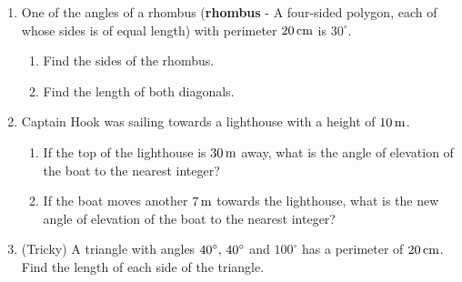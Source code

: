 \begin{enumerate}[noitemsep, label=\textbf{\arabic*}. ]
\label{m39414*uid113}\item One of the angles of a rhombus (\textbf{rhombus} - A four-sided polygon, each of whose sides is of equal length) with perimeter \begin{math}20\phantom{\rule{0.166667em}{0ex}}\mathrm{cm}\end{math} is \begin{math}{30}^{\circ }\end{math}.
\label{m39414*id92966}\begin{enumerate}[noitemsep, label=\textbf{\alph*}. ] 
            \label{m39414*uid114}\item Find the sides of the rhombus.
\label{m39414*uid115}\item Find the length of both diagonals.
\end{enumerate}
                \label{m39414*uid116}\item Captain Hook was sailing towards a lighthouse with a height of \begin{math}10\phantom{\rule{0.166667em}{0ex}}\mathrm{m}\end{math}.
\label{m39414*id93025}\begin{enumerate}[noitemsep, label=\textbf{\alph*}. ] 
            \label{m39414*uid117}\item If the top of the lighthouse is \begin{math}30\phantom{\rule{0.166667em}{0ex}}\mathrm{m}\end{math} away, what is the angle of elevation of the boat to the nearest integer?
\label{m39414*uid118}\item If the boat moves another \begin{math}7\phantom{\rule{0.166667em}{0ex}}\mathrm{m}\end{math} towards the lighthouse, what is the new angle of elevation of the boat to the nearest integer?
\end{enumerate}
                \label{m39414*uid119}\item (Tricky) A triangle with angles \begin{math}{40}^{\circ },\phantom{\rule{0.166667em}{0ex}}{40}^{\circ }\end{math} and \begin{math}{100}^{\circ }\end{math} has a perimeter of \begin{math}20\phantom{\rule{0.166667em}{0ex}}\mathrm{cm}\end{math}. Find the length of each side of the triangle.\newline
            
\end{enumerate}
        
